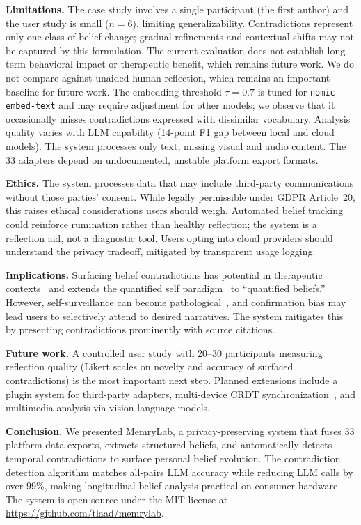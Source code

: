\documentclass[conference]{IEEEtran}
\begin{document}
\textbf{Limitations.} The case study involves a single participant (the first author) and the user study is small ($n{=}6$), limiting generalizability. Contradictions represent only one class of belief change; gradual refinements and contextual shifts may not be captured by this formulation. The current evaluation does not establish long-term behavioral impact or therapeutic benefit, which remains future work. We do not compare against unaided human reflection, which remains an important baseline for future work. The embedding threshold $\tau{=}0.7$ is tuned for \texttt{nomic-embed-text} and may require adjustment for other models; we observe that it occasionally misses contradictions expressed with dissimilar vocabulary. Analysis quality varies with LLM capability (14-point F1 gap between local and cloud models). The system processes only text, missing visual and audio content. The 33 adapters depend on undocumented, unstable platform export formats.

\textbf{Ethics.} The system processes data that may include third-party communications without those parties' consent. While legally permissible under GDPR Article~20, this raises ethical considerations users should weigh. Automated belief tracking could reinforce rumination rather than healthy reflection; the system is a reflection aid, not a diagnostic tool. Users opting into cloud providers should understand the privacy tradeoff, mitigated by transparent usage logging.

\textbf{Implications.} Surfacing belief contradictions has potential in therapeutic contexts~\cite{beck1979cognitive} and extends the quantified self paradigm~\cite{wolf2010quantified} to ``quantified beliefs.'' However, self-surveillance can become pathological~\cite{ruckenstein2014beyond}, and confirmation bias may lead users to selectively attend to desired narratives. The system mitigates this by presenting contradictions prominently with source citations.

\textbf{Future work.} A controlled user study with 20--30 participants measuring reflection quality (Likert scales on novelty and accuracy of surfaced contradictions) is the most important next step. Planned extensions include a plugin system for third-party adapters, multi-device CRDT synchronization~\cite{shapiro2011crdt}, and multimedia analysis via vision-language models.

\textbf{Conclusion.} We presented MemryLab, a privacy-preserving system that fuses 33 platform data exports, extracts structured beliefs, and automatically detects temporal contradictions to surface personal belief evolution. The contradiction detection algorithm matches all-pairs LLM accuracy while reducing LLM calls by over 99\%, making longitudinal belief analysis practical on consumer hardware. The system is open-source under the MIT license at \url{https://github.com/tlaad/memrylab}.
\end{document}
